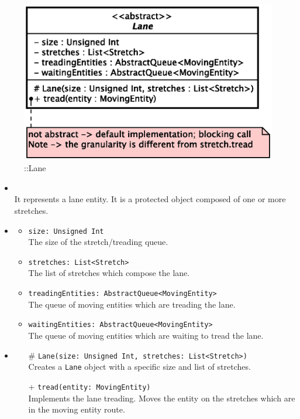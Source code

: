 \begin{figure}[h]
\centering
\includegraphics[scale=0.6,keepaspectratio]{images/solution/lane.eps}
\caption{\pReactiveComponentLane::Lane}
\label{fig:sd-app-lane}
\end{figure}
\FloatBarrier
\begin{itemize}
  \item \textbf{\descr} \\
    It represents a lane entity. It is a protected object composed of one or
    more stretches.
  \item \textbf{\attrs}
  \begin{itemize}
    \item \texttt{size: Unsigned Int} \\
The size of the stretch/treading queue.
    \item \texttt{stretches: List<Stretch>} \\
The list of stretches which compose the lane.
    \item \texttt{treadingEntities: AbstractQueue<MovingEntity>} \\
The queue of moving entities which are treading the lane.
    \item \texttt{waitingEntities: AbstractQueue<MovingEntity>} \\
The queue of moving entities which are waiting to tread the lane. 
  \end{itemize}
  \item \textbf{\ops}
  \begin{itemize} 
    \item[\#] \texttt{Lane(size: Unsigned Int, stretches: List<Stretch>)} \\
Creates a \texttt{Lane} object with a specific size and list of stretches.
    \item[+] \texttt{tread(entity: MovingEntity)} \\
Implements the lane treading. Moves the entity on the stretches which are 
in the moving entity route.
  \end{itemize}
\end{itemize}
